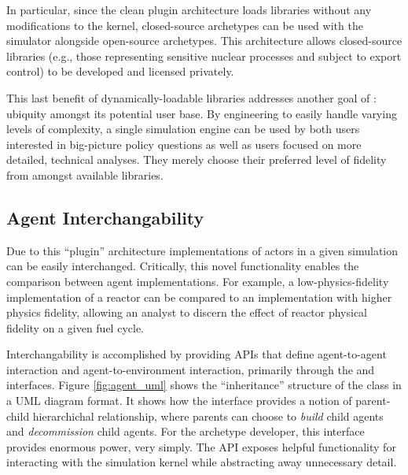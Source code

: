 In particular, since the clean plugin architecture loads libraries without any
modifications to the \Cyclus kernel, closed-source archetypes can be used with
the simulator alongside open-source archetypes. This architecture
allows closed-source libraries (e.g., those representing sensitive nuclear
processes and subject to export control) to be developed and licensed privately.

This last benefit of dynamically-loadable libraries addresses
another goal of \Cyclus: ubiquity amongst its potential user base. By
engineering \Cyclus to easily handle varying levels of complexity, a single
simulation engine can be used by both users interested in big-picture policy
questions as well as users focused on more detailed, technical
analyses. They merely choose their preferred level of fidelity from amongst 
available libraries. 

\subsection{Agent Interchangability}\label{sec:interchangeability}

Due to this ``plugin'' architecture
implementations of actors in a given simulation can be easily
interchanged. Critically, this novel functionality enables the comparison
between agent implementations. For example, a low-physics-fidelity
implementation of a reactor can be compared to an implementation with higher
physics fidelity, allowing an analyst to discern the effect of reactor physical
fidelity on a given fuel cycle. 

Interchangability is accomplished by providing \glspl{API} that define agent-to-agent
interaction and agent-to-environment interaction, primarily through the
 and  interfaces. Figure \ref{fig:agent_uml} shows 
the ``inheritance'' structure of the  class in a \gls{UML} diagram 
format. It shows how the  interface
provides a notion of parent-child hierarchichal relationship, where parents can
choose to \textit{build} child agents and \textit{decommission} child
agents. For the archetype developer, this interface provides enormous power, 
very simply. The \gls{API} exposes  helpful functionality for 
interacting with the \Cyclus simulation kernel while abstracting away unnecessary 
detail.

